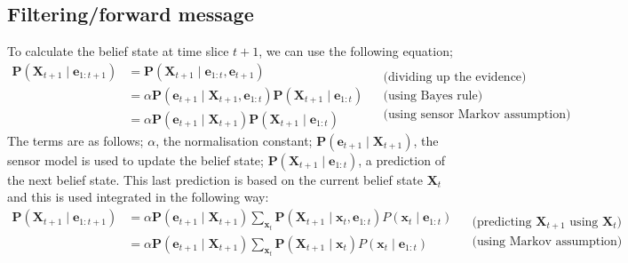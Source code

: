 \documentclass[11pt, letterpaper]{report}
\numberwithin{equation}{section}
\begin{document}
\subsection*{Filtering/forward message}
To calculate the belief state at time slice $t+1$, we can use the following
equation;
\begin{equation}
  \begin{split}
    \label{eq:filtering}
    \boldsymbol{P}(\boldsymbol{X}_{t+1} \mid \boldsymbol{e}_{1:t+1}) &=
      \boldsymbol{P}(\boldsymbol{X}_{t+1} \mid \boldsymbol{e}_{1:t}, \boldsymbol{e}_{t+1}) \\
    &= \alpha \boldsymbol{P}(\boldsymbol{e}_{t+1} \mid \boldsymbol{X}_{t+1}, \boldsymbol{e}_{1:t})
      \boldsymbol{P}(\boldsymbol{X}_{t+1} \mid \boldsymbol{e}_{1:t}) \\
    &= \alpha \boldsymbol{P}(\boldsymbol{e}_{t+1} \mid \boldsymbol{X}_{t+1})
     \boldsymbol{P}(\boldsymbol{X}_{t+1} \mid \boldsymbol{e}_{1:t})
  \end{split}
  \begin{split}
    &\text{(dividing up the evidence)}\\
    &\text{(using Bayes rule)} \\
    &\text{(using sensor Markov assumption)}
  \end{split}
\end{equation}
The terms are as follows; $\alpha$, the normalisation constant;
$\boldsymbol{P}(\boldsymbol{e}_{t+1} \mid \boldsymbol{X}_{t+1})$, the sensor
model is used to update the belief state;
$\boldsymbol{P}(\boldsymbol{X}_{t+1} \mid \boldsymbol{e}_{1:t})$, a prediction
of the next belief state. This last prediction is based on the current belief
state $\boldsymbol{X}_t$ and this is used integrated in the following way:
\begin{equation}
  \label{eq:filtering2}
  \begin{split}
    \boldsymbol{P}(\boldsymbol{X}_{t+1} \mid \boldsymbol{e}_{1:t+1}) &=
    \alpha \boldsymbol{P}(\boldsymbol{e}_{t+1} \mid \boldsymbol{X}_{t+1})
    \sum_{\boldsymbol{x}_t} \boldsymbol{P}(\boldsymbol{X}_{t+1} \mid \boldsymbol{x}_t,
    \boldsymbol{e}_{1:t}) P(\boldsymbol{x}_t \mid \boldsymbol{e}_{1:t}) \\
    &= \alpha \boldsymbol{P}(\boldsymbol{e}_{t+1} \mid \boldsymbol{X}_{t+1})
    \sum_{\boldsymbol{x}_t} \boldsymbol{P}(\boldsymbol{X}_{t+1} \mid \boldsymbol{x}_t)
    P(\boldsymbol{x}_t \mid \boldsymbol{e}_{1:t})
  \end{split}
  \begin{split}
    &\text{(predicting $\boldsymbol{X}_{t+1}$ using $\boldsymbol{X}_t$)} \\
    &\text{(using Markov assumption)}
  \end{split}
\end{equation}
\end{document}
